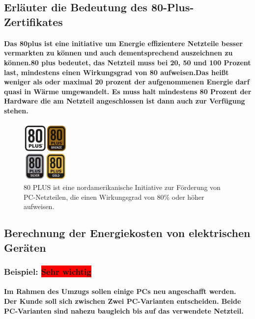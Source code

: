 \documentclass[a4paper]{article}
\begin{document}
    \subsection{\color{red}Erläuter die Bedeutung des 80-Plus-Zertifikates}\label{subsec:color{red}erläuter-die-bedeutung-des-80-plus-zertifikates}
        \paragraph{\color{codegreen} Das 80plus  ist eine initiative um Energie effizientere Netzteile besser vermarkten zu können und auch dementsprechend auszeichnen zu können.\color{blue}80 plus bedeutet, das Netzteil muss bei 20, 50
        und 100 Prozent last, mindestens einen Wirkungsgrad von 80 aufweisen.\color{codegreen}Das heißt weniger als oder maximal 20 prozent der aufgenommenen Energie darf quasi in Wärme umgewandelt. Es muss halt mindestens 80 Prozent der Hardware die am Netzteil angeschlossen ist dann auch zur Verfügung stehen.}
    \begin{center}
        \begin{figure}[H]
            \centering
            \includegraphics[height=3cm]{media/80plus}
            \captionsetup{labelformat=empty}
            \caption{\color{orange} 80 PLUS ist eine nordamerikanische Initiative zur Förderung von PC-Netzteilen, die einen Wirkungsgrad von 80\% oder höher aufweisen. }
            \label{fig:80plus}
        \end{figure}
    \end{center}
    \subsection{\color{red}Berechnung der Energiekosten von elektrischen Geräten}\label{subsec:berechnung-der-energiekosten-von-elektrischen-geräten}
        \subsubsection{Beispiel: \color{white}\colorbox{red}{Sehr wichtig}}
            \paragraph{\color{codegreen} Im Rahmen des Umzugs sollen einige PCs neu angeschafft werden. Der Kunde soll sich zwischen Zwei PC-Varianten entscheiden. Beide PC-Varianten sind nahezu baugleich bis auf das verwendete Netzteil.}
\end{document}
